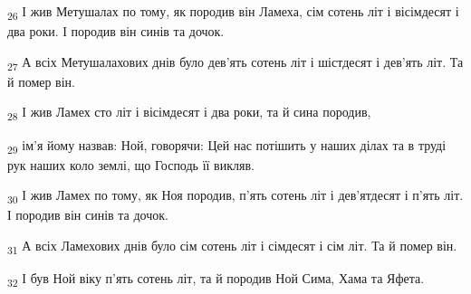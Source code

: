 \begin{tcolorbox}
\textsubscript{26} І жив Метушалах по тому, як породив він Ламеха, сім сотень літ і вісімдесят і два роки. І породив він синів та дочок.
\end{tcolorbox}
\begin{tcolorbox}
\textsubscript{27} А всіх Метушалахових днів було дев'ять сотень літ і шістдесят і дев'ять літ. Та й помер він.
\end{tcolorbox}
\begin{tcolorbox}
\textsubscript{28} І жив Ламех сто літ і вісімдесят і два роки, та й сина породив,
\end{tcolorbox}
\begin{tcolorbox}
\textsubscript{29} ім'я йому назвав: Ной, говорячи: Цей нас потішить у наших ділах та в труді рук наших коло землі, що Господь її викляв.
\end{tcolorbox}
\begin{tcolorbox}
\textsubscript{30} І жив Ламех по тому, як Ноя породив, п'ять сотень літ і дев'ятдесят і п'ять літ. І породив він синів та дочок.
\end{tcolorbox}
\begin{tcolorbox}
\textsubscript{31} А всіх Ламехових днів було сім сотень літ і сімдесят і сім літ. Та й помер він.
\end{tcolorbox}
\begin{tcolorbox}
\textsubscript{32} І був Ной віку п'ять сотень літ, та й породив Ной Сима, Хама та Яфета.
\end{tcolorbox}
